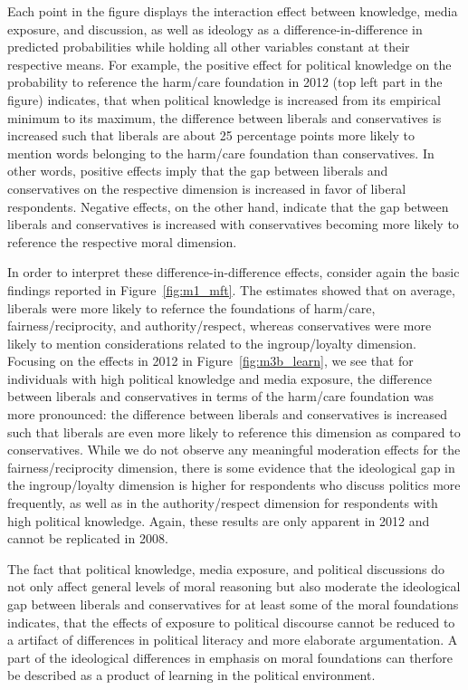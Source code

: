 \documentclass[12pt]{article}
\begin{document}
Each point in the figure displays the interaction effect between knowledge, media exposure, and discussion, as well as ideology as a difference-in-difference in predicted probabilities while holding all other variables constant at their respective means. For example, the positive effect for political knowledge on the probability to reference the harm/care foundation in 2012 (top left part in the figure) indicates, that when political knowledge is increased from its empirical minimum to its maximum, the difference between liberals and conservatives is increased such that liberals are about 25 percentage points more likely to mention words belonging to the harm/care foundation than conservatives. In other words, positive effects imply that the gap between liberals and conservatives on the respective dimension is increased in favor of liberal respondents. Negative effects, on the other hand, indicate that the gap between liberals and conservatives is increased with conservatives becoming more likely to reference the respective moral dimension.

In order to interpret these difference-in-difference effects, consider again the basic findings reported in Figure~\ref{fig:m1_mft}. The estimates showed that on average, liberals were more likely to refernce the foundations of harm/care, fairness/reciprocity, and authority/respect, whereas conservatives were more likely to mention considerations related to the ingroup/loyalty dimension. Focusing on the effects in 2012 in Figure~\ref{fig:m3b_learn}, we see that for individuals with high political knowledge and media exposure, the difference between liberals and conservatives in terms of the harm/care foundation was more pronounced: the difference between liberals and conservatives is increased such that liberals are even more likely to reference this dimension as compared to conservatives. While we do not observe any meaningful moderation effects for the fairness/reciprocity dimension, there is some evidence that the ideological gap in the ingroup/loyalty dimension is higher for respondents who discuss politics more frequently, as well as in the authority/respect dimension for respondents with high political knowledge. Again, these results are only apparent in 2012 and cannot be replicated in 2008.

The fact that political knowledge, media exposure, and political discussions do not only affect general levels of moral reasoning but also moderate the ideological gap between liberals and conservatives for at least some of the moral foundations indicates, that the effects of exposure to political discourse cannot be reduced to a artifact of differences in political literacy and more elaborate argumentation. A part of the ideological differences in emphasis on moral foundations can therfore be described as a product of learning in the political environment.
\end{document}
